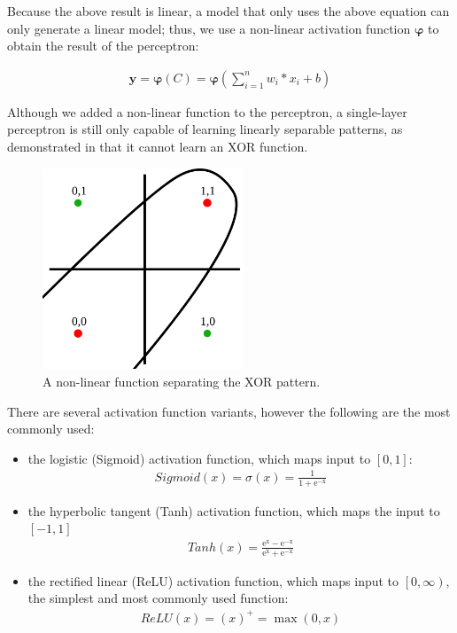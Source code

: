 \documentclass{report}[12pt, a4paper]
\begin{document}
Because the above result is linear, a model that only uses the above equation can only generate a linear model; thus, we use a non-linear activation function $\pmb{\varphi}$ to obtain the result of the perceptron:

\begin{align*}
    \pmb{y} = \pmb{\varphi}(C) = \pmb{\varphi}(\sum_{i=1}^n w_{i} * x_{i} + b)
\end{align*}

Although we added a non-linear function to the perceptron, a single-layer perceptron is still only capable of learning linearly separable patterns, as \citeauthor{minsky1969perceptrons} demonstrated in \cite{minsky1969perceptrons} that it cannot learn an XOR function.

\begin{figure}[htp]
    \centering
    \includegraphics[width=6cm]{xor_diagram}
    \caption{A non-linear function separating the XOR pattern.}
    \label{fig:xor_diagram}
\end{figure}


There are several activation function variants, however the following are the most commonly used:

\begin{itemize}
    \item the logistic (Sigmoid) activation function, which maps input to $\left[0,1\right]$:
        \begin{align*}
            Sigmoid(x) = \sigma (x) =  \frac{\mathrm{1} }{\mathrm{1} + \mathrm{e^{-x}} } 
        \end{align*}
    \item the hyperbolic tangent (Tanh) activation function, which maps the input to $\left[-1,1\right]$
        \begin{align*}
            Tanh(x) = \frac{\mathrm{e^x} - \mathrm{e^{-x}}}{\mathrm{e^x} + \mathrm{e^{-x}}} 
        \end{align*}
    \item the rectified linear (ReLU) activation function, which maps input to $\left[0,\infty\right)$, the simplest and most commonly used function:
        \begin{align*}
            ReLU(x) = (x)^\mathrm{+} = \max(\mathrm{0}, x)
        \end{align*}
\end{itemize}
\end{document}

